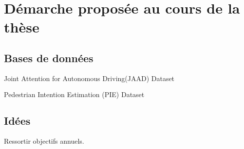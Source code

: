 \clearpage
\section{Démarche proposée au cours de la thèse}
\label{sec:SOTA}

\subsection{Bases de données}
Joint Attention for Autonomous Driving(JAAD) Dataset \cite{2016arXiv160904741K,Rasouli_2017_ICCV}

Pedestrian Intention Estimation (PIE) Dataset \cite{Rasouli2019PIE}

\subsection{Idées}
Ressortir objectifs annuels.
